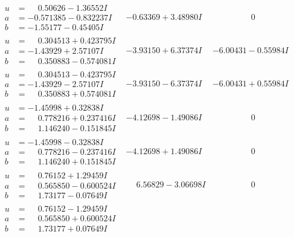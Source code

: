 \documentclass[1p]{elsarticle_modified}
\theoremstyle{definition}
\begin{document}
$$\begin{array}{c|c|c}
\begin{aligned}
u &= \phantom{-}0.50626 - 1.36552 I \\
a &= -0.571385 - 0.832237 I \\
b &= -1.55177 - 0.45405 I\end{aligned}
 & -0.63369 + 3.48980 I & \phantom{-0.000000 } 0 \\ \hline\begin{aligned}
u &= \phantom{-}0.304513 + 0.423795 I \\
a &= -1.43929 + 2.57107 I \\
b &= \phantom{-}0.350883 - 0.574081 I\end{aligned}
 & -3.93150 + 6.37374 I & -6.00431 - 0.55984 I \\ \hline\begin{aligned}
u &= \phantom{-}0.304513 - 0.423795 I \\
a &= -1.43929 - 2.57107 I \\
b &= \phantom{-}0.350883 + 0.574081 I\end{aligned}
 & -3.93150 - 6.37374 I & -6.00431 + 0.55984 I \\ \hline\begin{aligned}
u &= -1.45998 + 0.32838 I \\
a &= \phantom{-}0.778216 + 0.237416 I \\
b &= \phantom{-}1.146240 - 0.151845 I\end{aligned}
 & -4.12698 - 1.49086 I & \phantom{-0.000000 } 0 \\ \hline\begin{aligned}
u &= -1.45998 - 0.32838 I \\
a &= \phantom{-}0.778216 - 0.237416 I \\
b &= \phantom{-}1.146240 + 0.151845 I\end{aligned}
 & -4.12698 + 1.49086 I & \phantom{-0.000000 } 0 \\ \hline\begin{aligned}
u &= \phantom{-}0.76152 + 1.29459 I \\
a &= \phantom{-}0.565850 - 0.600524 I \\
b &= \phantom{-}1.73177 - 0.07649 I\end{aligned}
 & \phantom{-}6.56829 - 3.06698 I & \phantom{-0.000000 } 0 \\ \hline\begin{aligned}
u &= \phantom{-}0.76152 - 1.29459 I \\
a &= \phantom{-}0.565850 + 0.600524 I \\
b &= \phantom{-}1.73177 + 0.07649 I\end{aligned}

\end{array}$$
\end{document}
